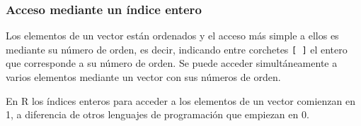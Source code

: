 \documentclass[
  a4paper,
]{scrreport}
\theoremstyle{definition}
\theoremstyle{definition}
\theoremstyle{remark}
\begin{document}
\hypertarget{acceso-mediante-un-uxedndice-entero}{%
\subsubsection{Acceso mediante un índice
entero}\label{acceso-mediante-un-uxedndice-entero}}

Los elementos de un vector están ordenados y el acceso más simple a
ellos es mediante su número de orden, es decir, indicando entre
corchetes \texttt{{[}\ {]}} el entero que corresponde a su número de
orden. Se puede acceder simultáneamente a varios elementos mediante un
vector con sus números de orden.

\begin{tcolorbox}[enhanced jigsaw, colbacktitle=quarto-callout-warning-color!10!white, breakable, opacitybacktitle=0.6, left=2mm, opacityback=0, leftrule=.75mm, colframe=quarto-callout-warning-color-frame, bottomrule=.15mm, toprule=.15mm, toptitle=1mm, colback=white, titlerule=0mm, title=\textcolor{quarto-callout-warning-color}{\faExclamationTriangle}\hspace{0.5em}{Advertencia}, rightrule=.15mm, arc=.35mm, bottomtitle=1mm, coltitle=black]

En R los índices enteros para acceder a los elementos de un vector
comienzan en 1, a diferencia de otros lenguajes de programación que
empiezan en 0.

\end{tcolorbox}
\end{document}
